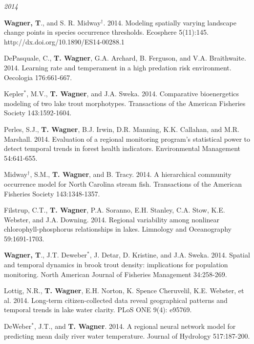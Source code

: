 \documentclass[10pt]{article}
\begin{document}
\begin{flushleft}
\begin{etaremune}[start=48]
\end{etaremune}
\emph{2014}
\begin{etaremune}[start=41]
\item {\bf Wagner, T}., and S. R. Midway$^\dagger$. 2014. Modeling spatially varying landscape change points in species occurrence thresholds. Ecosphere 5(11):145. http://dx.doi.org/10.1890/ES14-00288.1 

\item DePasquale, C., {\bf T. Wagner}, G.A. Archard, B. Ferguson, and V.A. Braithwaite. 2014. Learning rate and temperament in a high predation risk environment. Oecologia 176:661-667. 

\item Kepler$^*$, M.V., {\bf T. Wagner}, and J.A. Sweka. 2014. Comparative bioenergetics modeling of two lake trout morphotypes. Transactions of the American Fisheries Society 143:1592-1604.

\item Perles, S.J., {\bf T. Wagner}, B.J. Irwin, D.R. Manning, K.K. Callahan, and M.R. Marshall. 2014. Evaluation of a regional monitoring program's statistical power to detect temporal trends in forest health indicators. Environmental Management 54:641-655.

\item Midway$^\dagger$, S.M., {\bf T. Wagner}, and B. Tracy. 2014. A hierarchical community occurrence model for North Carolina stream fish. Transactions of the American Fisheries Society 143:1348-1357.

\item Filstrup, C.T., {\bf T. Wagner}, P.A. Soranno, E.H. Stanley, C.A. Stow, K.E. Webster, and J.A. Downing. 2014. Regional variability among nonlinear chlorophyll-phosphorus relationships in lakes. Limnology and Oceanography 59:1691-1703. 

\item {\bf Wagner, T}., J.T. Deweber$^*$, J. Detar, D. Kristine, and J.A. Sweka. 2014. Spatial and temporal dynamics in brook trout density: implications for population monitoring. North American Journal of Fisheries Management 34:258-269.

\item Lottig, N.R., {\bf T. Wagner}, E.H. Norton, K. Spence Cheruvelil, K.E. Webster, et al. 2014. Long-term citizen-collected data reveal geographical patterns and temporal trends in lake water clarity. PLoS ONE 9(4): e95769. 

\item DeWeber$^*$, J.T., and {\bf T. Wagner}. 2014. A regional neural network model for predicting mean daily river water temperature. Journal of Hydrology 517:187-200.


\end{etaremune}
\end{flushleft}
\end{document}
